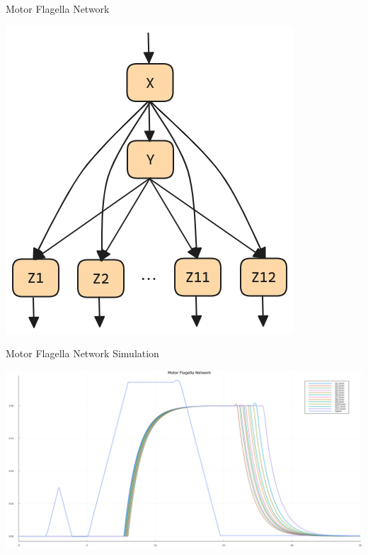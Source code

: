 \documentclass{beamer}
\begin{document}
\begin{frame}{Motor Flagella Network}
    \begin{center}
        \includegraphics[scale=0.25]{multioutput_FFL_color.png}
    \end{center}
\end{frame}

\begin{frame}{Motor Flagella Network Simulation}
    \begin{center}
        \includegraphics[scale=0.20]{motor_flagella.png}
    \end{center}
\end{frame}



\end{document}

